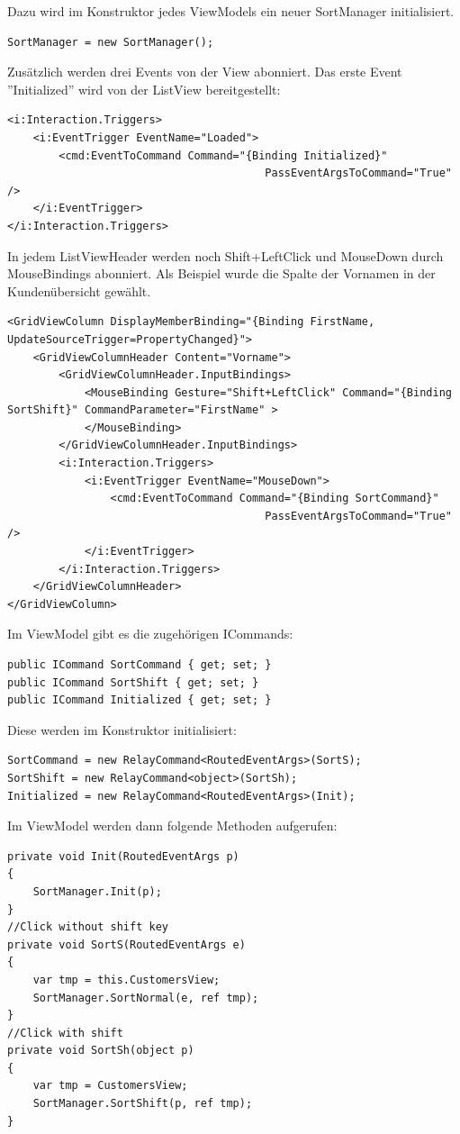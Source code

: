 Dazu wird im Konstruktor jedes ViewModels ein neuer SortManager initialisiert.
\begin{lstlisting}
SortManager = new SortManager();
\end{lstlisting}
Zusätzlich werden drei Events von der View abonniert. \newline Das erste Event ''Initialized'' wird von der ListView bereitgestellt:
\begin{lstlisting}
<i:Interaction.Triggers>
	<i:EventTrigger EventName="Loaded">
		<cmd:EventToCommand Command="{Binding Initialized}"
                                        PassEventArgsToCommand="True" />
	</i:EventTrigger>
</i:Interaction.Triggers>
\end{lstlisting}
In jedem ListViewHeader werden noch Shift+LeftClick und MouseDown durch MouseBindings abonniert. Als Beispiel wurde die Spalte der Vornamen in der Kundenübersicht gewählt.
\begin{lstlisting}
<GridViewColumn DisplayMemberBinding="{Binding FirstName, UpdateSourceTrigger=PropertyChanged}">
	<GridViewColumnHeader Content="Vorname">
		<GridViewColumnHeader.InputBindings>
			<MouseBinding Gesture="Shift+LeftClick" Command="{Binding SortShift}" CommandParameter="FirstName" >
			</MouseBinding>
		</GridViewColumnHeader.InputBindings>
		<i:Interaction.Triggers>
			<i:EventTrigger EventName="MouseDown">
				<cmd:EventToCommand Command="{Binding SortCommand}"
                                        PassEventArgsToCommand="True" />
			</i:EventTrigger>
		</i:Interaction.Triggers>
	</GridViewColumnHeader>
</GridViewColumn>
\end{lstlisting}
Im ViewModel gibt es die zugehörigen ICommands:
\begin{lstlisting}
public ICommand SortCommand { get; set; }
public ICommand SortShift { get; set; }
public ICommand Initialized { get; set; }
\end{lstlisting}
Diese werden im Konstruktor initialisiert:
\begin{lstlisting}
SortCommand = new RelayCommand<RoutedEventArgs>(SortS);
SortShift = new RelayCommand<object>(SortSh);
Initialized = new RelayCommand<RoutedEventArgs>(Init);
\end{lstlisting}
Im ViewModel werden dann folgende Methoden aufgerufen:
\begin{lstlisting}
private void Init(RoutedEventArgs p)
{
	SortManager.Init(p);
}
//Click without shift key
private void SortS(RoutedEventArgs e)
{
	var tmp = this.CustomersView;
	SortManager.SortNormal(e, ref tmp);
}
//Click with shift
private void SortSh(object p)
{
	var tmp = CustomersView;
	SortManager.SortShift(p, ref tmp);
}
\end{lstlisting}
